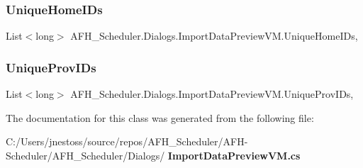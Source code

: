 \mbox{\label{class_a_f_h___scheduler_1_1_dialogs_1_1_import_data_preview_v_m_a34e7ce0fb00f961b820db4e3329746b3}} 
\subsubsection{UniqueHomeIDs}
{\footnotesize\ttfamily List$<$long$>$ A\+F\+H\+\_\+\+Scheduler.\+Dialogs.\+Import\+Data\+Preview\+V\+M.\+Unique\+Home\+I\+Ds\hspace{0.3cm}{\ttfamily [get]}, {\ttfamily [set]}}

\mbox{\label{class_a_f_h___scheduler_1_1_dialogs_1_1_import_data_preview_v_m_a7ac560b1d9f1406557c33a3d79bb663a}} 
\subsubsection{UniqueProvIDs}
{\footnotesize\ttfamily List$<$long$>$ A\+F\+H\+\_\+\+Scheduler.\+Dialogs.\+Import\+Data\+Preview\+V\+M.\+Unique\+Prov\+I\+Ds\hspace{0.3cm}{\ttfamily [get]}, {\ttfamily [set]}}



The documentation for this class was generated from the following file\+:\begin{DoxyCompactItemize}
\item 
C\+:/\+Users/jnestoss/source/repos/\+A\+F\+H\+\_\+\+Scheduler/\+A\+F\+H-\/\+Scheduler/\+A\+F\+H\+\_\+\+Scheduler/\+Dialogs/\textbf{ Import\+Data\+Preview\+V\+M.\+cs}\end{DoxyCompactItemize}
